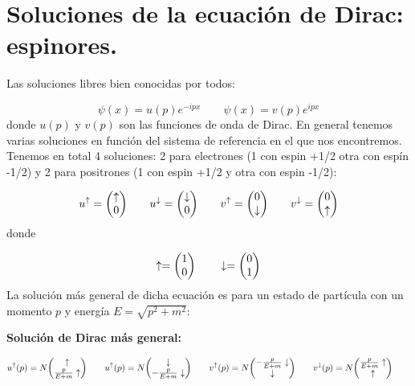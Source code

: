 \section{Soluciones de la ecuación de Dirac: espinores.}
Las soluciones libres bien conocidas por todos: 

\begin{equation}
    \psi(x) = u(p) e^{-ipx} \quad  \quad \psi(x) = v(p) e^{ipx}
\end{equation}
donde $u(p)$ y $v(p)$ son las funciones de onda de Dirac. En general tenemos varias soluciones en función del sistema de referencia en el que nos encontremos. Tenemos en total 4 soluciones: 2 para electrones (1 con espin +1/2 otra con espín -1/2) y 2 para positrones (1 con espin +1/2 y otra con espin -1/2): 

\begin{equation*}
    u^\uparrow = \mqty(\uparrow \\ 0)  \qquad 
    u^\downarrow = \mqty(\downarrow \\ 0)  \qquad 
    v^\uparrow = \mqty( 0 \\ \downarrow) \qquad 
    v^\downarrow = \mqty(0 \\ \uparrow)   
\end{equation*}
donde 

\begin{equation*}
    \uparrow = \mqty(1 \\ 0) \qquad 
    \downarrow = \mqty(0 \\ 1)
\end{equation*}
La solución más general de dicha ecuación es para un estado de partícula con un momento $p$ y energía $E=\sqrt{p^2 + m^2}$:

\begin{Resaltar}
    \begin{center}
    \textbf{Solución de Dirac más general:}
    \end{center}
    \begin{equation*}
        u^\uparrow(p) = N  \mqty(\uparrow \\ \frac{p}{E+m} \uparrow)  \qquad 
        u^\uparrow(p) = N  \mqty(\downarrow \\ -\frac{p}{E+m} \downarrow)  \qquad 
        v^\uparrow(p) = N  \mqty(-\frac{p}{E+m}\downarrow \\ \downarrow)  \qquad 
        v^\downarrow(p) = N  \mqty(\frac{p}{E+m}\uparrow \\ \uparrow)  \qquad 
    \end{equation*}
\end{Resaltar}


